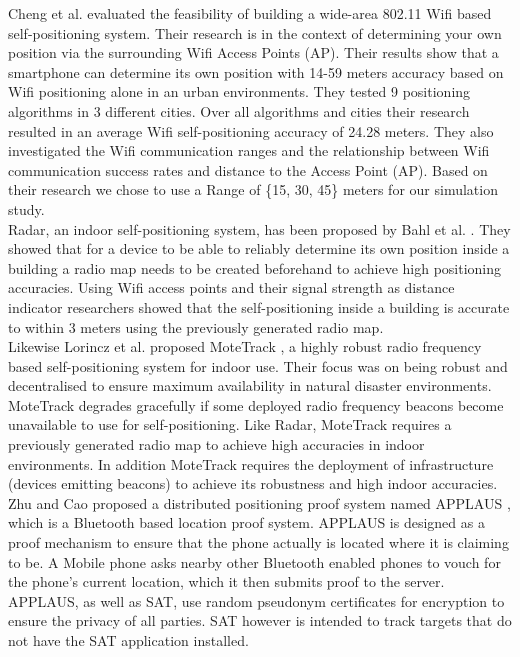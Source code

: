 \documentclass[10pt,titlepage]{article}
\begin{document}
Cheng et al. \cite{CHENG} evaluated the feasibility of building a wide-area 802.11 Wifi based self-positioning system. Their research is in the context of determining your own position via the surrounding Wifi Access Points (AP). Their results show that a smartphone can determine its own position with 14-59 meters accuracy based on Wifi positioning alone in an urban environments. They tested 9 positioning algorithms in 3 different cities. Over all algorithms and cities their research resulted in an average Wifi self-positioning accuracy of 24.28 meters. \newline They also investigated the Wifi communication ranges and the relationship between Wifi communication success rates and distance to the Access Point (AP). Based on their research we chose to use a Range of \{15, 30, 45\} meters for our simulation study.\\

Radar, an indoor self-positioning system, has been proposed by Bahl et al. \cite{RADAR}. They showed that for a device to be able to reliably determine its own position inside a building a radio map needs to be created beforehand to achieve high positioning accuracies. Using Wifi access points and their signal strength as distance indicator researchers showed that the self-positioning inside a building is accurate to within 3 meters using the previously generated radio map.\\

Likewise Lorincz et al. proposed MoteTrack \cite{MOTETRACK}, a highly robust radio frequency based self-positioning system for indoor use. Their focus was on being robust and decentralised to ensure maximum availability in natural disaster environments. MoteTrack degrades gracefully if some deployed radio frequency beacons become unavailable to use for self-positioning. Like Radar, MoteTrack requires a previously generated radio map to achieve high accuracies in indoor environments. In addition MoteTrack requires the deployment of infrastructure (devices emitting beacons) to achieve its robustness and high indoor accuracies.\\


Zhu and Cao proposed a distributed positioning proof system named APPLAUS \cite{APPLAUS}, which is a Bluetooth based location proof system. APPLAUS is designed as a proof mechanism to ensure that the phone actually is located where it is claiming to be. A Mobile phone asks nearby other Bluetooth enabled phones to vouch for the phone's current location, which it then submits proof to the server. APPLAUS, as well as SAT, use random pseudonym certificates for encryption to ensure the privacy of all parties.  SAT however is intended to track targets that do not have the SAT application installed.\\
\end{document}
